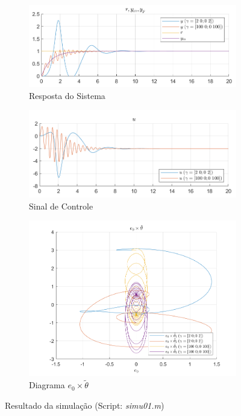 \documentclass[10pt]{article}
\begin{document}
\begin{figure}[h!]
    \begin{subfigure}[b]{0.45\textwidth}
        \centering
        \includegraphics[width=\textwidth]{img/fig01c.png}
        \caption{Resposta do Sistema}
    \end{subfigure}
    \begin{subfigure}[b]{0.45\textwidth}
        \centering
        \includegraphics[width=\textwidth]{img/fig01e.png}
        \caption{Sinal de Controle}
    \end{subfigure}

    \vspace{0.5cm}

    \begin{subfigure}[b]{0.4\textwidth}
        \centering
        \includegraphics[width=\textwidth]{img/fig01d.png}
        \caption{Diagrama $e_0 \times \tilde{\theta}$}
    \end{subfigure}

    \caption{Resultado da simulação (Script: \textit{simu01.m})}
    \label{fig:sim1}
\end{figure}
\end{document}
